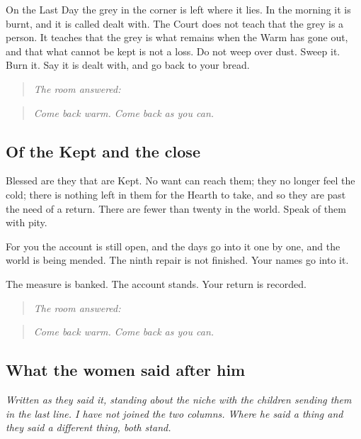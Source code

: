 \documentclass{design/chronicle}
\begin{document}
On the Last Day the grey in the corner is left where it lies. In the morning it is burnt, and it is called dealt with. The Court does not teach that the grey is a person. It teaches that the grey is what remains when the Warm has gone out, and that what cannot be kept is not a loss. Do not weep over dust. Sweep it. Burn it. Say it is dealt with, and go back to your bread.

\begin{quote}\itshape \emph{The room answered:}\end{quote}

\begin{quote}\itshape \end{quote}

\begin{quote}\itshape Come back warm. Come back as you can.\end{quote}

\subsection*{Of the Kept and the close}

Blessed are they that are Kept. No want can reach them; they no longer feel the cold; there is nothing left in them for the Hearth to take, and so they are past the need of a return. There are fewer than twenty in the world. Speak of them with pity.

For you the account is still open, and the days go into it one by one, and the world is being mended. The ninth repair is not finished. Your names go into it.

The measure is banked. The account stands. Your return is recorded.

\begin{quote}\itshape \emph{The room answered:}\end{quote}

\begin{quote}\itshape \end{quote}

\begin{quote}\itshape Come back warm. Come back as you can.\end{quote}

\subsection*{What the women said after him}

\emph{Written as they said it, standing about the niche with the children sending them in the last line. I have not joined the two columns. Where he said a thing and they said a different thing, both stand.}
\end{document}
